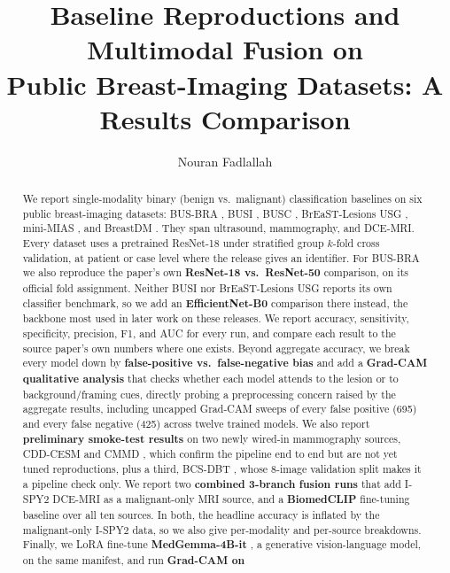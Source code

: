 \documentclass[11pt]{article}
\title{Baseline Reproductions and Multimodal Fusion on\\Public Breast-Imaging Datasets: A Results Comparison}
\author{Nouran Fadlallah}
\date{}
\begin{document}
\maketitle

\begin{abstract}
We report single-modality binary (benign vs.\ malignant) classification
baselines on six public breast-imaging datasets: BUS-BRA
\citep{gomezflores2024busbra}, BUSI \citep{aldhabyani2020busi}, BUSC
\citep{busc2023mendeley,iqbalsharif2023pdfunet}, BrEaST-Lesions USG
\citep{pawlowska2024breast}, mini-MIAS \citep{suckling1994mias}, and
BreastDM \citep{zhao2023breastdm}. They span ultrasound, mammography, and
DCE-MRI. Every dataset uses a pretrained ResNet-18 under stratified group
$k$-fold cross validation, at patient or case level where the release gives
an identifier. For BUS-BRA we also reproduce the paper's own \textbf{ResNet-18 vs.\
ResNet-50} comparison, on its official fold assignment. Neither BUSI nor
BrEaST-Lesions USG reports its own classifier benchmark, so we add an
\textbf{EfficientNet-B0} comparison there instead, the backbone most used
in later work on these releases. We report accuracy, sensitivity,
specificity, precision, F1, and AUC for every run, and compare each result
to the source paper's own numbers where one exists. Beyond aggregate
accuracy, we break every model down by \textbf{false-positive vs.\
false-negative bias} and add a \textbf{Grad-CAM qualitative analysis} that
checks whether each model attends to the lesion or to background/framing
cues, directly probing a preprocessing concern raised by the aggregate
results, including uncapped Grad-CAM sweeps of every false positive (695)
and every false negative (425) across twelve trained models. We also report \textbf{preliminary smoke-test results} on two
newly wired-in mammography sources, CDD-CESM \citep{khaled2022cddcesm} and
CMMD \citep{cui2021cmmd}, which confirm the pipeline end to end but are not
yet tuned reproductions, plus a third, BCS-DBT \citep{buda2021bcsdbt},
whose 8-image validation split makes it a pipeline check only. We report two \textbf{combined 3-branch fusion runs} that add I-SPY2
DCE-MRI \citep{fridman2025breastdcedl} as a malignant-only MRI source, and
a \textbf{BiomedCLIP} \citep{zhang2023biomedclip} fine-tuning baseline over
all ten sources. In both, the headline accuracy is inflated by the
malignant-only I-SPY2 data, so we also give per-modality and
per-source breakdowns. Finally, we LoRA fine-tune
\textbf{MedGemma-4B-it} \citep{sellergren2025medgemma}, a generative
vision-language model, on the same manifest, and run \textbf{Grad-CAM on
}
\end{abstract}
\end{document}
